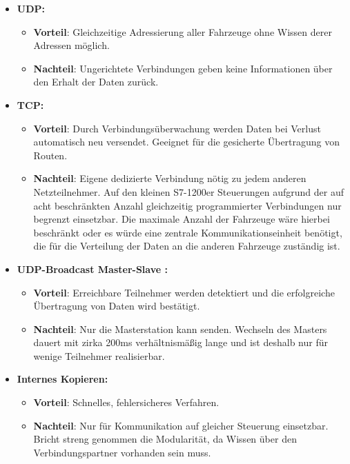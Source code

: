 		\begin{itemize}
			\item \textbf{\ac{UDP}:} 
				\begin{itemize}
					\item \textbf{Vorteil}: Gleichzeitige Adressierung aller Fahrzeuge ohne Wissen derer Adressen möglich.
					\item \textbf{Nachteil}: Ungerichtete Verbindungen geben keine Informationen über den Erhalt der Daten zurück.
				\end{itemize}
			\item \textbf{\acs{TCP}:}
				\begin{itemize}
					\item \textbf{Vorteil}: Durch Verbindungsüberwachung werden Daten bei Verlust automatisch neu versendet. Geeignet für die gesicherte Übertragung von Routen.
					\item \textbf{Nachteil}: Eigene dedizierte Verbindung nötig zu jedem anderen Netzteilnehmer. Auf den kleinen S7-1200er Steuerungen aufgrund der auf acht beschränkten Anzahl gleichzeitig programmierter Verbindungen \cite{S7-1200} nur begrenzt einsetzbar. Die maximale Anzahl der Fahrzeuge wäre hierbei beschränkt oder es würde eine zentrale Kommunikationseinheit benötigt, die für die Verteilung der Daten an die anderen Fahrzeuge zuständig ist.
				\end{itemize}
			\item \textbf{\ac{UDP}-Broadcast Master-Slave \cite{MasterSlaveUDP}:}
				\begin{itemize}
					\item \textbf{Vorteil}: Erreichbare Teilnehmer werden detektiert und die erfolgreiche Übertragung von Daten wird bestätigt.
					\item \textbf{Nachteil}: Nur die Masterstation kann senden. Wechseln des Masters dauert mit zirka 200ms verhältnismäßig lange und ist deshalb nur für wenige Teilnehmer realisierbar. 
				\end{itemize}
			\item \textbf{Internes Kopieren:}
			\begin{itemize}
				\item \textbf{Vorteil}: Schnelles, fehlersicheres Verfahren.
				\item \textbf{Nachteil}: Nur für Kommunikation auf gleicher Steuerung einsetzbar. Bricht streng genommen die Modularität, da Wissen über den Verbindungspartner vorhanden sein muss.
			\end{itemize}
		\end{itemize}
		
